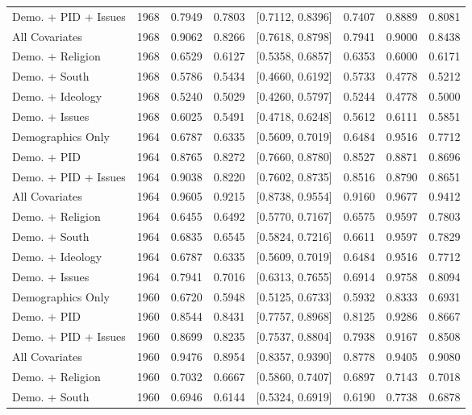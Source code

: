 \begin{longtable}{lrrrlrrr}
  Demo. + PID + Issues & 1968 & 0.7949 & 0.7803 & [0.7112, 0.8396] & 0.7407 & 0.8889 & 0.8081 \\ 
  All Covariates & 1968 & 0.9062 & 0.8266 & [0.7618, 0.8798] & 0.7941 & 0.9000 & 0.8438 \\ 
  Demo. + Religion & 1968 & 0.6529 & 0.6127 & [0.5358, 0.6857] & 0.6353 & 0.6000 & 0.6171 \\ 
  Demo. + South & 1968 & 0.5786 & 0.5434 & [0.4660, 0.6192] & 0.5733 & 0.4778 & 0.5212 \\ 
  Demo. + Ideology & 1968 & 0.5240 & 0.5029 & [0.4260, 0.5797] & 0.5244 & 0.4778 & 0.5000 \\ 
  Demo. + Issues & 1968 & 0.6025 & 0.5491 & [0.4718, 0.6248] & 0.5612 & 0.6111 & 0.5851 \\ 
  Demographics Only & 1964 & 0.6787 & 0.6335 & [0.5609, 0.7019] & 0.6484 & 0.9516 & 0.7712 \\ 
  Demo. + PID & 1964 & 0.8765 & 0.8272 & [0.7660, 0.8780] & 0.8527 & 0.8871 & 0.8696 \\ 
  Demo. + PID + Issues & 1964 & 0.9038 & 0.8220 & [0.7602, 0.8735] & 0.8516 & 0.8790 & 0.8651 \\ 
  All Covariates & 1964 & 0.9605 & 0.9215 & [0.8738, 0.9554] & 0.9160 & 0.9677 & 0.9412 \\ 
  Demo. + Religion & 1964 & 0.6455 & 0.6492 & [0.5770, 0.7167] & 0.6575 & 0.9597 & 0.7803 \\ 
  Demo. + South & 1964 & 0.6835 & 0.6545 & [0.5824, 0.7216] & 0.6611 & 0.9597 & 0.7829 \\ 
  Demo. + Ideology & 1964 & 0.6787 & 0.6335 & [0.5609, 0.7019] & 0.6484 & 0.9516 & 0.7712 \\ 
  Demo. + Issues & 1964 & 0.7941 & 0.7016 & [0.6313, 0.7655] & 0.6914 & 0.9758 & 0.8094 \\ 
  Demographics Only & 1960 & 0.6720 & 0.5948 & [0.5125, 0.6733] & 0.5932 & 0.8333 & 0.6931 \\ 
  Demo. + PID & 1960 & 0.8544 & 0.8431 & [0.7757, 0.8968] & 0.8125 & 0.9286 & 0.8667 \\ 
  Demo. + PID + Issues & 1960 & 0.8699 & 0.8235 & [0.7537, 0.8804] & 0.7938 & 0.9167 & 0.8508 \\ 
  All Covariates & 1960 & 0.9476 & 0.8954 & [0.8357, 0.9390] & 0.8778 & 0.9405 & 0.9080 \\ 
  Demo. + Religion & 1960 & 0.7032 & 0.6667 & [0.5860, 0.7407] & 0.6897 & 0.7143 & 0.7018 \\ 
  Demo. + South & 1960 & 0.6946 & 0.6144 & [0.5324, 0.6919] & 0.6190 & 0.7738 & 0.6878 \\ 

\end{longtable}
